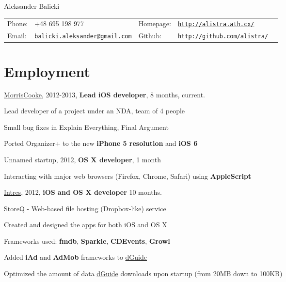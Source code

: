 \documentclass[letterpaper]{article}
\def\name{Aleksander Balicki}
\renewenvironment{itemize}{
  \begin{list}{}{
    \setlength{\leftmargin}{1.5em}
  }
}{
  \end{list}
}
\begin{document}
\centerline{\huge \name}
\vspace{0.25in}

\begin{tabularx}{\textwidth}{lXlll}
        Phone: 	& +48 695 198 977 & Homepage: & \href{http://alistra.ath.cx/}{\tt http://alistra.ath.cx/} \\
        Email: 	& \href{mailto:balicki.aleksander@gmail.com}{\tt balicki.aleksander@gmail.com}
        & Github: & \href{http://github.com/alistra/}{\tt http://github.com/alistra/}\\
    \end{tabularx}

\section*{Employment}

\begin{itemize}
    \item \href{http://www.morriscooke.com}{MorrisCooke}, 2012-2013, {\bf Lead iOS developer}, 8 months, current.
		\begin{itemize}
            \item Lead developer of a project under an NDA, team of 4 people
            \item Small bug fixes in Explain Everything, Final Argument
            \item Ported Organizer+ to the new {\bf iPhone 5 resolution} and {\bf iOS 6}
		\end{itemize}

	\item Unnamed startup, 2012, {\bf OS X developer}, 1 month
		\begin{itemize}
			\item Interacting with major web browsers (Firefox, Chrome, Safari) using {\bf AppleScript}
		\end{itemize}

    \item \href{http://intres.com.pl}{Intres}, 2012, {\bf iOS and OS X developer} 10 months.
		\begin{itemize}

            \item \href{http://storeq.com}{StoreQ} - Web-based file hosting (Dropbox-like) service
                \begin{itemize}
                    \item Created and designed the apps for both iOS and OS X
                    \item Frameworks used: {\bf fmdb}, {\bf Sparkle}, {\bf CDEvents}, {\bf Growl}
                \end{itemize}

            \item Added {\bf iAd} and {\bf AdMob} frameworks to \href{http://dguide.pl}{dGuide}

            \item Optimized the amount of data \href{http://dguide.pl}{dGuide} downloads upon startup (from 20MB down to 100KB)

        \end{itemize}

\end{itemize}
\end{document}
